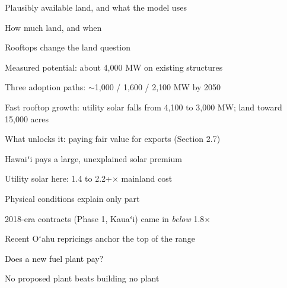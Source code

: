 \documentclass[11pt,aspectratio=169]{beamer}
\begin{document}
\begin{frame}{Plausibly available land, and what the model uses}
\end{frame}

\begin{frame}{How much land, and when}
\end{frame}

\begin{frame}{Rooftops change the land question}
\begin{wideitemize}
  \item Measured potential: about 4{,}000 MW on existing structures
  \item Three adoption paths: $\sim$1{,}000 / 1{,}600 / 2{,}100 MW by 2050
  \item Fast rooftop growth: utility solar falls from 4{,}100 to
        3{,}000 MW; land toward 15{,}000 acres
  \item What unlocks it: paying fair value for exports (Section 2.7)
\end{wideitemize}
\end{frame}

\begin{frame}{Hawaiʻi pays a large, unexplained solar premium}
\begin{center}
  {\LARGE Utility solar here: \textcolor{uhbrick}{1.4 to 2.2+$\times$}
   mainland cost}
\end{center}
\vspace{0.4cm}
\begin{wideitemize}
  \item Physical conditions explain only part
  \item 2018-era contracts (Phase 1, Kauaʻi) came in \emph{below} 1.8$\times$
  \item Recent Oʻahu repricings anchor the top of the range
\end{wideitemize}
\end{frame}

\begin{transitionframe}
  \begin{center}{\Huge \textcolor{black}{Does a new fuel plant pay?}}\end{center}
\end{transitionframe}

\begin{frame}{No proposed plant beats building no plant}
\end{frame}
\end{document}

